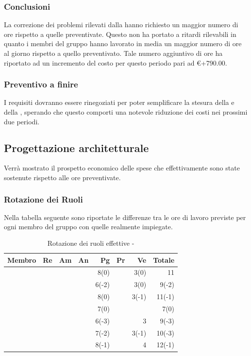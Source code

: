 \documentclass[12pt,a4paper]{article}
\begin{document}
\subsubsection{Conclusioni}
La correzione dei problemi rilevati dalla \RR{} hanno richiesto un maggior numero di ore rispetto a quelle preventivate.
Questo non ha portato a ritardi rilevabili in quanto i membri del gruppo hanno lavorato in media un maggior numero di ore al giorno rispetto a quello preventivato.
Tale numero aggiuntivo di ore ha riportato ad un incremento del costo per questo periodo pari ad \euro{}+790.00.

\subsubsection{Preventivo a finire}
I requisiti dovranno essere rinegoziati per poter semplificare la stesura della \ST{} e della \DP{}, sperando
che questo comporti una notevole riduzione dei costi nei prossimi due periodi. 

\newpage

\subsection{Progettazione architetturale}
Verrà mostrato il prospetto economico delle spese che effettivamente sono state sostenute rispetto alle ore preventivate.

\subsubsection{Rotazione dei Ruoli}
Nella tabella seguente sono riportate le differenze tra le ore di lavoro previste per ogni membro del gruppo con quelle realmente impiegate.

\begin{table}[H]
	\begin{center}
		\begin{tabular}{l r r r r r r r}
			\toprule
			\textbf{Membro}	&	\textbf{Re}	&	\textbf{Am}	& \textbf{An} & \textbf{Pg} & \textbf{Pr} & \textbf{Ve} & \textbf{Totale}\\
			\midrule
			\midrule
            \IB{} & & & & 8(0) & & 3(0) & 11 \\
			\midrule
            \AB{} & & & & 6(-2) & & 3(0) & 9(-2) \\
			\midrule
            \NDC{} & & & & 8(0) & & 3(-1) & 11(-1) \\
			\midrule
            \TP{} & & & & 7(0) & & & 7(0) \\
			\midrule
            \WS{} & & & & 6(-3) & & 3 & 9(-3) \\
			\midrule
            \AVE{} & & & & 7(-2) & & 3(-1) & 10(-3) \\
			\midrule
            \AVI{} & & & & 8(-1) & & 4 & 12(-1) \\
			\bottomrule
		\end{tabular}
		\caption{Rotazione dei ruoli effettive - \FPA{}}
	\end{center}
\end{table}
\end{document}
